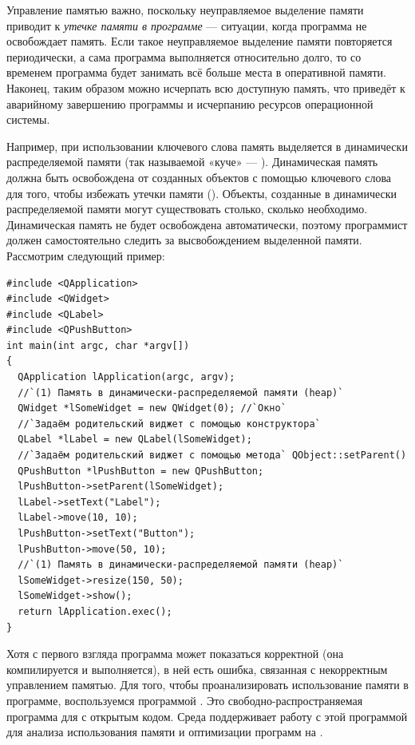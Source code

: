 Управление памятью важно, поскольку неуправляемое выделение памяти приводит к \emph{утечке памяти
в программе} --- ситуации, когда программа не освобождает память. Если такое неуправляемое выделение памяти повторяется
периодически, а сама программа выполняется относительно долго, то со временем программа будет занимать всё больше места
в оперативной памяти. Наконец, таким образом можно исчерпать всю доступную память, что приведёт к аварийному завершению
программы и исчерпанию ресурсов операционной системы.

Например, при использовании ключевого слова  память выделяется в динамически распределяемой памяти (так называемой «куче» --- ). Динамическая память должна быть
освобождена от созданных объектов с помощью ключевого слова  для того, чтобы избежать утечки памяти
(). Объекты, созданные в динамически распределяемой памяти могут существовать столько, сколько
необходимо. Динамическая память не будет освобождена автоматически, поэтому программист должен самостоятельно следить
за высвобождением выделенной памяти. Рассмотрим следующий пример:
\begin{lstlisting}
#include <QApplication>
#include <QWidget>
#include <QLabel>
#include <QPushButton>
int main(int argc, char *argv[])
{
  QApplication lApplication(argc, argv);
  //`(1) Память в динамически-распределяемой памяти (heap)`
  QWidget *lSomeWidget = new QWidget(0); //`Окно`
  //`Задаём родительский виджет с помощью конструктора`
  QLabel *lLabel = new QLabel(lSomeWidget);
  //`Задаём родительский виджет с помощью метода` QObject::setParent()
  QPushButton *lPushButton = new QPushButton;
  lPushButton->setParent(lSomeWidget);
  lLabel->setText("Label");
  lLabel->move(10, 10);
  lPushButton->setText("Button");
  lPushButton->move(50, 10);
  //`(1) Память в динамически-распределяемой памяти (heap)`
  lSomeWidget->resize(150, 50);
  lSomeWidget->show();
  return lApplication.exec();
}
\end{lstlisting}

Хотя с первого взгляда программа может показаться корректной (она компилируется и выполняется), в ней есть ошибка,
связанная с некорректным управлением памятью. Для того, чтобы проанализировать использование памяти в программе,
воспользуемся программой . Это свободно-распространяемая программа для  с открытым кодом.
Среда  поддерживает работу с этой программой для анализа использования памяти 
и оптимизации программ на .

